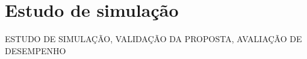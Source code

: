 \chapter{Estudo de simulação}

ESTUDO DE SIMULAÇÃO, VALIDAÇÃO DA PROPOSTA, AVALIAÇÃO DE DESEMPENHO



